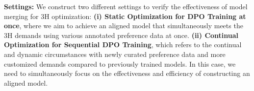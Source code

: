 








\textbf{Settings:} We construct two different settings to verify the effectiveness of model merging for 3H optimization: \textbf{(i) Static Optimization for DPO Training at once}, where we aim to achieve an aligned model that simultaneously meets the 3H demands using various annotated preference data at once. \textbf{(ii) Continual Optimization for Sequential DPO Training}, which refers to the continual and dynamic circumstances with newly curated preference data and more customized demands compared to previously trained models. In this case, we need to simultaneously focus on the effectiveness and efficiency of constructing an aligned model.

